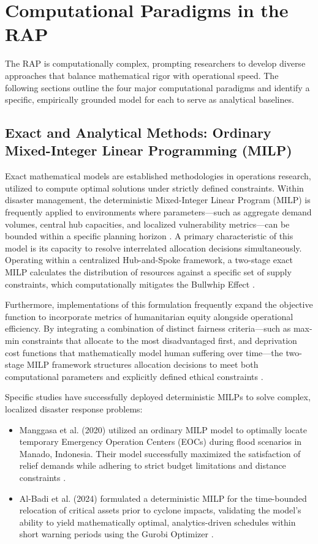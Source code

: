 \section{Computational Paradigms in the RAP}
The RAP is computationally complex, prompting researchers to develop diverse approaches that balance mathematical rigor with operational speed. The following sections outline the four major computational paradigms and identify a specific, empirically grounded model for each to serve as analytical baselines.

\subsection{Exact and Analytical Methods: Ordinary Mixed-Integer Linear Programming (MILP)}
Exact mathematical models are established methodologies in operations research, utilized to compute optimal solutions under strictly defined constraints. Within disaster management, the deterministic Mixed-Integer Linear Program (MILP) is frequently applied to environments where parameters—such as aggregate demand volumes, central hub capacities, and localized vulnerability metrics—can be bounded within a specific planning horizon \cite{albadi2024, manggasa2020}. A primary characteristic of this model is its capacity to resolve interrelated allocation decisions simultaneously. Operating within a centralized Hub-and-Spoke framework, a two-stage exact MILP calculates the distribution of resources against a specific set of supply constraints, which computationally mitigates the Bullwhip Effect \cite{manggasa2020}.

Furthermore, implementations of this formulation frequently expand the objective function to incorporate metrics of humanitarian equity alongside operational efficiency. By integrating a combination of distinct fairness criteria—such as max-min constraints that allocate to the most disadvantaged first, and deprivation cost functions that mathematically model human suffering over time—the two-stage MILP framework structures allocation decisions to meet both computational parameters and explicitly defined ethical constraints \cite{albadi2024}.

Specific studies have successfully deployed deterministic MILPs to solve complex, localized disaster response problems:
\begin{itemize}
    \item Manggasa et al. (2020) utilized an ordinary MILP model to optimally locate temporary Emergency Operation Centers (EOCs) during flood scenarios in Manado, Indonesia. Their model successfully maximized the satisfaction of relief demands while adhering to strict budget limitations and distance constraints \cite{manggasa2020}. 
    \item Al-Badi et al. (2024) formulated a deterministic MILP for the time-bounded relocation of critical assets prior to cyclone impacts, validating the model's ability to yield mathematically optimal, analytics-driven schedules within short warning periods using the Gurobi Optimizer \cite{albadi2024}. 
\end{itemize}

